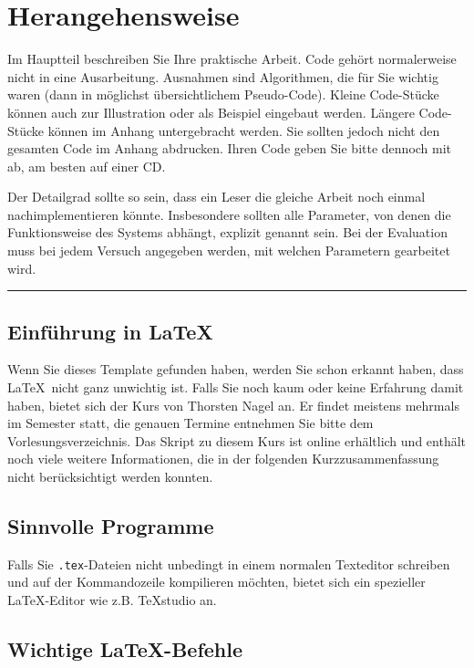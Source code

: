 
\chapter{Herangehensweise}

Im Hauptteil beschreiben Sie Ihre praktische Arbeit. Code gehört normalerweise nicht in eine Ausarbeitung. Ausnahmen sind Algorithmen, die für Sie wichtig waren (dann in möglichst übersichtlichem Pseudo-Code). Kleine Code-Stücke können auch zur Illustration oder als Beispiel eingebaut werden. Längere Code-Stücke können im Anhang untergebracht werden. Sie sollten jedoch nicht den gesamten Code im Anhang abdrucken. Ihren Code geben Sie bitte dennoch mit ab, am besten auf einer CD.

Der Detailgrad sollte so sein, dass ein Leser die gleiche Arbeit noch einmal nachimplementieren könnte. Insbesondere sollten alle Parameter, von denen die Funktionsweise des Systems abhängt, explizit genannt sein. Bei der Evaluation muss bei jedem Versuch angegeben werden, mit welchen Parametern gearbeitet wird.


\hfil\rule{0.4\textwidth}{0.4pt}

\section{Einführung in \LaTeX}
Wenn Sie dieses Template gefunden haben, werden Sie schon erkannt haben, dass \LaTeX\ nicht ganz unwichtig ist. Falls Sie noch kaum oder keine Erfahrung damit haben, bietet sich der Kurs  von Thorsten Nagel an. Er findet meistens mehrmals im Semester statt, die genauen Termine entnehmen Sie bitte dem Vorlesungsverzeichnis. Das Skript zu diesem Kurs ist online erhältlich \cite{thorstennagel2015} und enthält noch viele weitere Informationen, die in der folgenden Kurzzusammenfassung nicht berücksichtigt werden konnten.

\section{Sinnvolle Programme}
Falls Sie \verb|.tex|-Dateien nicht unbedingt in einem normalen Texteditor schreiben und auf der Kommandozeile kompilieren möchten, bietet sich ein spezieller \LaTeX-Editor wie z.B. TeXstudio \cite{texstudio} an.

\section{Wichtige \LaTeX-Befehle}
